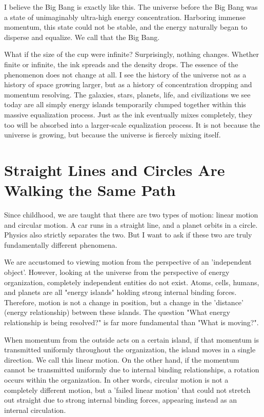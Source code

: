 \documentclass[11pt,a4paper]{article}
\begin{document}
I believe the Big Bang is exactly like this. The universe before the Big Bang was a state of unimaginably ultra-high energy concentration. Harboring immense momentum, this state could not be stable, and the energy naturally began to disperse and equalize. We call that the Big Bang.

What if the size of the cup were infinite? Surprisingly, nothing changes. Whether finite or infinite, the ink spreads and the density drops. The essence of the phenomenon does not change at all. I see the history of the universe not as a history of space growing larger, but as a history of concentration dropping and momentum resolving. The galaxies, stars, planets, life, and civilizations we see today are all simply energy islands temporarily clumped together within this massive equalization process. Just as the ink eventually mixes completely, they too will be absorbed into a larger-scale equalization process. It is not because the universe is growing, but because the universe is fiercely mixing itself.

\section*{Straight Lines and Circles Are Walking the Same Path}
Since childhood, we are taught that there are two types of motion: linear motion and circular motion. A car runs in a straight line, and a planet orbits in a circle. Physics also strictly separates the two. But I want to ask if these two are truly fundamentally different phenomena.

We are accustomed to viewing motion from the perspective of an 'independent object'. However, looking at the universe from the perspective of energy organization, completely independent entities do not exist. Atoms, cells, humans, and planets are all "energy islands" holding strong internal binding forces. Therefore, motion is not a change in position, but a change in the 'distance' (energy relationship) between these  islands. The question "What energy relationship is being resolved?" is far more fundamental than "What is moving?".

When momentum from the outside acts on a certain island, if that momentum is transmitted uniformly throughout the organization, the island moves in a single direction. We call this linear motion. On the other hand, if the momentum cannot be transmitted uniformly due to internal binding relationships, a rotation occurs within the organization. In other words, circular motion is not a completely different motion, but a 'failed linear motion' that could not stretch out straight due to strong internal binding forces, appearing instead as an internal circulation.
\end{document}
